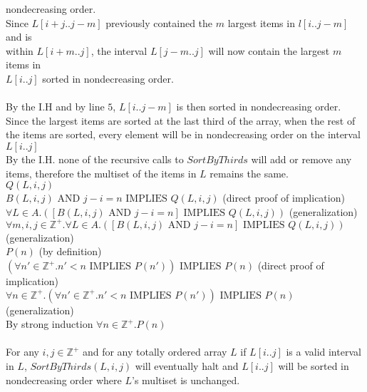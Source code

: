 \documentclass[11pt]{article}
\def\ints {{\mathbb Z}}
\newcommand{\Implies}{\mbox{ IMPLIES }}
\newcommand{\And}{\mbox{ AND }}
\begin{document}
\begin{enumerate}
\begin{solution}
\null\qquad\qquad\quad nondecreasing order.\\
\null\qquad\qquad\quad Since $L[i+j..j-m]$ previously contained the $m$ largest items in $l[i..j-m]$ and is\\
\null\qquad\qquad\quad within $L[i+m..j]$, the interval $L[j-m..j]$ will now contain the largest $m$ items in \\
\null\qquad\qquad\quad $L[i..j]$ sorted in nondecreasing order.\\\\
\null\qquad\qquad\quad By the I.H and by line $5$, $L[i..j-m]$ is then sorted in nondecreasing order.\\
\null\qquad\qquad\quad Since the largest items are sorted at the last third of the array, when the rest of \\
\null\qquad\qquad\quad the items are sorted, every element will be in nondecreasing order on the interval \\
\null\qquad\qquad\quad $L[i..j]$\\
\null\qquad\qquad\quad By the I.H. none of the recursive calls to $SortByThirds$ will add or remove any \\
\null\qquad\qquad\quad items, therefore the multiset of the items in $L$ remains the same.\\
\null\qquad\qquad\quad $Q(L, i, j)$\\
\null\qquad\qquad $B(L, i, j) \And  j - i= n\Implies Q(L, i, j)$ (direct proof of implication)\\
\null\qquad\quad $\forall L\in A.\left([B(L, i, j) \And  j - i= n]\Implies Q(L, i, j)\right)$ (generalization)\\
\null\qquad $\forall m,i,j\in\ints^+.\forall L\in A.\left([B(L, i, j) \And  j - i= n]\Implies Q(L, i, j)\right)$ (generalization)\\
\null\qquad $P(n)$ (by definition)\\
\null\quad $(\forall n'\in\ints^+.n'<n \Implies P(n'))\Implies P(n)$ (direct proof of implication)\\
$\forall n\in\ints^+.(\forall n'\in\ints^+.n'<n \Implies P(n'))\Implies P(n)$ (generalization)\\
By strong induction $\forall n\in\ints^+.P(n)$\\\\
For any $i, j\in \ints^+$ and for any totally ordered array $L$ if $L[i..j]$ is a valid interval in $L$, $SortByThirds(L, i, j)$ will eventually halt and $L[i..j]$ will be sorted in nondecreasing order where $L$'s multiset is unchanged.
\end{solution}
\end{enumerate}
\end{document}
